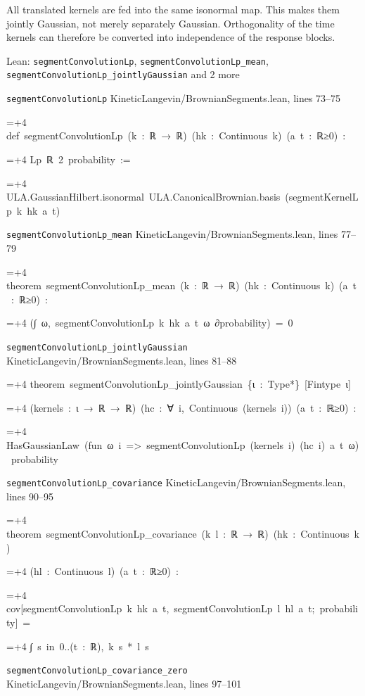 \documentclass[11pt,a4paper]{article}
\newlength{\leancharwidth}
\newenvironment{leancode}{\par\smallskip\begingroup\ttfamily\footnotesize\raggedright
  \settowidth{\leancharwidth}{M}\setlength{\parskip}{0pt}\setlength{\parindent}{0pt}
  \frenchspacing}{\par\endgroup\smallskip}
\newcommand{\leanline}[2]{\hangindent=\dimexpr#1\leancharwidth+4\leancharwidth\relax
  \hangafter=1\noindent\hspace*{#1\leancharwidth}#2\par}
\newcommand{\leansource}[1]{\par{\footnotesize\color{leanmuted}#1}\par}
\begin{document}
All translated kernels are fed into the same isonormal map. This makes them jointly Gaussian, not merely separately Gaussian. Orthogonality of the time kernels can therefore be converted into independence of the response blocks.

\begin{leanbox}{Lean: \texttt{segmentConvolutionLp}, \texttt{segmentConvolutionLp\_\allowbreak{}mean}, \texttt{segmentConvolutionLp\_\allowbreak{}jointlyGaussian} and 2 more}
\leansource{\texttt{segmentConvolutionLp} \quad KineticLangevin/\allowbreak{}BrownianSegments.lean, lines 73–75}
\begin{leancode}
\leanline{0}{def\ segmentConvolutionLp\ (k\ :\ ℝ\ →\ ℝ)\ (hk\ :\ Continuous\ k)\ (a\ t\ :\ ℝ≥0)\ :}
\leanline{4}{Lp\ ℝ\ 2\ probability\ :=}
\leanline{2}{ULA.GaussianHilbert.isonormal\ ULA.CanonicalBrownian.basis\ (segmentKernelLp\ k\ hk\ a\ t)}
\end{leancode}
\leansource{\texttt{segmentConvolutionLp\_\allowbreak{}mean} \quad KineticLangevin/\allowbreak{}BrownianSegments.lean, lines 77–79}
\begin{leancode}
\leanline{0}{theorem\ segmentConvolutionLp\_mean\ (k\ :\ ℝ\ →\ ℝ)\ (hk\ :\ Continuous\ k)\ (a\ t\ :\ ℝ≥0)\ :}
\leanline{4}{(∫\ ω,\ segmentConvolutionLp\ k\ hk\ a\ t\ ω\ ∂probability)\ =\ 0}
\end{leancode}
\leansource{\texttt{segmentConvolutionLp\_\allowbreak{}jointlyGaussian} \quad KineticLangevin/\allowbreak{}BrownianSegments.lean, lines 81–88}
\begin{leancode}
\leanline{0}{theorem\ segmentConvolutionLp\_jointlyGaussian\ \{ι\ :\ Type*\}\ [Fintype\ ι]}
\leanline{4}{(kernels\ :\ ι\ →\ ℝ\ →\ ℝ)\ (hc\ :\ ∀\ i,\ Continuous\ (kernels\ i))\ (a\ t\ :\ ℝ≥0)\ :}
\leanline{4}{HasGaussianLaw\ (fun\ ω\ i\ =>\ segmentConvolutionLp\ (kernels\ i)\ (hc\ i)\ a\ t\ ω)\ probability}
\end{leancode}
\leansource{\texttt{segmentConvolutionLp\_\allowbreak{}covariance} \quad KineticLangevin/\allowbreak{}BrownianSegments.lean, lines 90–95}
\begin{leancode}
\leanline{0}{theorem\ segmentConvolutionLp\_covariance\ (k\ l\ :\ ℝ\ →\ ℝ)\ (hk\ :\ Continuous\ k)}
\leanline{4}{(hl\ :\ Continuous\ l)\ (a\ t\ :\ ℝ≥0)\ :}
\leanline{4}{cov[segmentConvolutionLp\ k\ hk\ a\ t,\ segmentConvolutionLp\ l\ hl\ a\ t;\ probability]\ =}
\leanline{6}{∫\ s\ in\ 0..(t\ :\ ℝ),\ k\ s\ *\ l\ s}
\end{leancode}
\leansource{\texttt{segmentConvolutionLp\_\allowbreak{}covariance\_\allowbreak{}zero} \quad KineticLangevin/\allowbreak{}BrownianSegments.lean, lines 97–101}

\end{leanbox}
\end{document}
